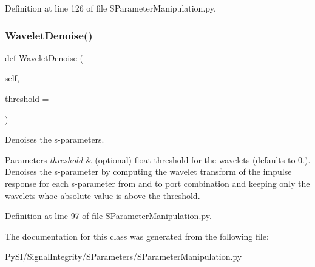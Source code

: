 Definition at line 126 of file S\+Parameter\+Manipulation.\+py.

\mbox{\label{classSignalIntegrity_1_1SParameters_1_1SParameterManipulation_1_1SParameterManipulation_a537884def79fedd9611365a1de55471f}} 
\subsubsection{\texorpdfstring{Wavelet\+Denoise()}{WaveletDenoise()}}
{\footnotesize\ttfamily def Wavelet\+Denoise (\begin{DoxyParamCaption}\item[{}]{self,  }\item[{}]{threshold = {} }\end{DoxyParamCaption})}



Denoises the s-\/parameters. 


\begin{DoxyParams}{Parameters}
{\em threshold} & (optional) float threshold for the wavelets (defaults to 0.). Denoises the s-\/parameter by computing the wavelet transform of the impulse response for each s-\/parameter from and to port combination and keeping only the wavelets whoe absolute value is above the threshold. \\
\hline
\end{DoxyParams}


Definition at line 97 of file S\+Parameter\+Manipulation.\+py.



The documentation for this class was generated from the following file\+:\begin{DoxyCompactItemize}
\item 
Py\+S\+I/\+Signal\+Integrity/\+S\+Parameters/S\+Parameter\+Manipulation.\+py\end{DoxyCompactItemize}
